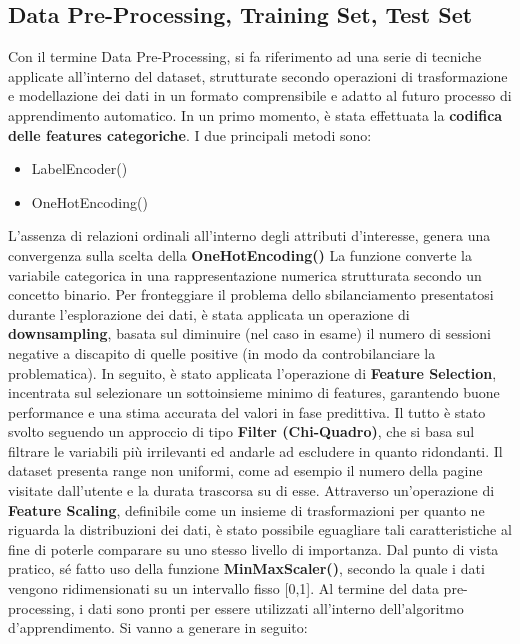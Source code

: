 \documentclass[10pt,a4paper]{article}
\begin{document}
\subsection{Data Pre-Processing, Training Set, Test Set}
Con il termine Data Pre-Processing, si fa riferimento ad una serie di tecniche applicate all'interno del dataset, strutturate secondo operazioni di trasformazione e modellazione dei dati in un formato comprensibile e adatto al futuro processo di apprendimento automatico.\hfill \break
In un primo momento, è stata effettuata la \textbf{codifica delle features categoriche}.\hfill \break
I due principali metodi sono:
\begin{itemize}
    \item LabelEncoder()
\end{itemize}
\begin{itemize}
    \item OneHotEncoding()
\end{itemize}
L'assenza di relazioni ordinali all'interno degli attributi d'interesse, genera una convergenza sulla scelta della \textbf{OneHotEncoding()}\hfill \break
La funzione converte la variabile categorica in una rappresentazione numerica strutturata secondo un concetto binario.\hfill \break \break
Per fronteggiare il problema dello sbilanciamento presentatosi durante l'esplorazione dei dati, è stata applicata un operazione di \textbf{downsampling}, basata sul diminuire (nel caso in esame) il numero di sessioni negative a discapito di quelle positive (in modo da controbilanciare la problematica).\hfill \break
In seguito, è stato applicata l'operazione di \textbf{Feature Selection}, incentrata sul selezionare un sottoinsieme minimo di features, garantendo buone performance e una stima accurata del valori in fase predittiva. Il tutto è stato svolto seguendo un approccio di tipo \textbf{Filter (Chi-Quadro)}, che si basa sul filtrare le variabili più irrilevanti ed andarle ad  escludere in quanto ridondanti.\hfill \break
Il dataset presenta range non uniformi, come ad esempio il numero della pagine visitate dall'utente e la durata trascorsa su di esse.\hfill \break
Attraverso un'operazione di \textbf{Feature Scaling}, definibile come un insieme di trasformazioni per quanto ne riguarda la distribuzioni dei dati, è stato possibile eguagliare tali caratteristiche al fine di poterle comparare su uno stesso livello di importanza.\hfill \break
Dal punto di vista pratico, sé fatto uso della funzione \textbf{MinMaxScaler()}, secondo la quale i dati vengono ridimensionati su un intervallo fisso [0,1].
\hfill \break\break
Al termine del data pre-processing, i dati sono pronti per essere utilizzati all'interno dell'algoritmo d'apprendimento.\hfill \break
Si vanno a generare in seguito:
\end{document}
